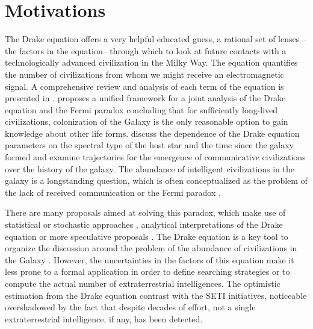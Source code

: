 \section{Motivations}\label{S_motivations}

The Drake equation \citep{drake_intelligent_1962}
offers a very helpful educated guess,
a rational set of lenses --the factors in the equation-- through which
to look at future contacts with a technologically advanced
civilization in the Milky Way.
%
The equation quantifies the number of
civilizations from whom we might receive an electromagnetic signal.
%
A comprehensive review and analysis of each term of the equation
is presented in \citet{vakoch_drake_2015}.
%
\citet{prantzos_joint_2013}
proposes a unified framework
for a joint analysis of the Drake equation and the Fermi paradox
concluding that for sufficiently long-lived civilizations,
colonization of the Galaxy is the only reasonable option to gain
knowledge about other life forms.
%
\citet{haqq-misra_drake_2017}
discuss the dependence of the Drake equation parameters on the
spectral type of the host star and the time since the galaxy formed
and examine trajectories for the emergence of communicative
civilizations over the history of the galaxy.
%
The abundance of
intelligent civilizations in the galaxy is a longstanding question,
which is often conceptualized as the problem of the lack of received
communication or the Fermi paradox 
\citep{barlow_galactic_2012, Sotos_biotechnology_2019,
forgan_galactic_2016}.



There are many proposals aimed at solving this paradox, which make use
of statistical \citep{solomonides_probabilistic_2016,
vanhouten_isthere_2017, horvat_calculating_2007,
maccone_statistical_2015} or stochastic approaches
\citep{forgan_numerical_2009, bloetscher_using_2019,
glade_stochastic_2011, forgan_numerical_2010}, analytical
interpretations of the Drake equation \citep{prantzos_joint_2013,
smith_broadcasting_2009} or more speculative proposals
\citep{barlow_galactic_2013, lampton_information_2013,
conway_three_2018, forgan_galactic_2017}.
%
\Fpagebreak
%
The Drake equation is a key tool
to organize the discussion around the problem of the abundance
of civilizations 
in the Galaxy \citep{hinkel_interdisciplinary_2019}.
%
However, the uncertainties in the factors of this equation make
it less prone to a formal application in order to define searching
strategies or to compute the actual number of extraterrestrial
intelligences.
%
The optimistic estimation from the Drake equation contrast with
the 
SETI initiatives,
noticeable overshadowed by the fact that despite decades of effort, not a
single extraterrestrial intelligence, if any, has been detected.




